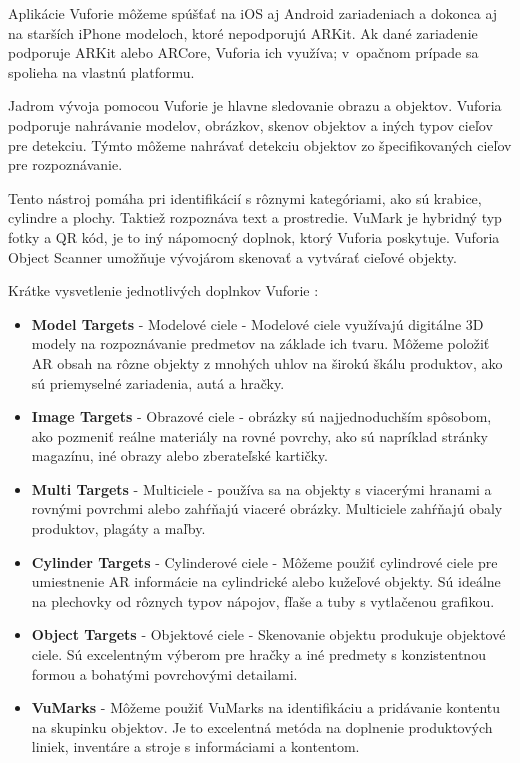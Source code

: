 Aplikácie Vuforie môžeme spúšťať na iOS aj Android zariadeniach a dokonca aj na starších iPhone modeloch, ktoré nepodporujú ARKit. Ak dané zariadenie podporuje ARKit alebo ARCore, Vuforia ich využíva; v~opačnom prípade sa spolieha na vlastnú platformu.

Jadrom vývoja pomocou Vuforie je hlavne sledovanie obrazu a objektov. Vuforia podporuje nahrávanie modelov, obrázkov, skenov objektov a iných typov cieľov pre detekciu. Týmto môžeme nahrávať detekciu objektov zo špecifikovaných cieľov pre rozpoznávanie.

Tento nástroj pomáha pri identifikácií s rôznymi kategóriami, ako sú krabice, cylindre a plochy. Taktiež rozpoznáva text a prostredie. VuMark je hybridný typ fotky a QR kód, je to iný nápomocný doplnok, ktorý Vuforia poskytuje. Vuforia Object Scanner umožňuje vývojárom skenovať a vytvárať cieľové objekty. 

Krátke vysvetlenie jednotlivých doplnkov Vuforie \cite{anand2024vuforia}:

\begin{itemize}
    \item \textbf{Model Targets} - Modelové ciele - Modelové ciele využívajú digitálne 3D modely na rozpoznávanie predmetov na základe ich tvaru. Môžeme položiť AR obsah na rôzne objekty z mnohých uhlov na širokú škálu produktov, ako sú priemyselné zariadenia, autá a hračky. %
    
    \item \textbf{Image Targets} - Obrazové ciele - obrázky sú najjednoduchším spôsobom, ako pozmeniť reálne materiály na rovné povrchy, ako sú napríklad stránky magazínu, iné obrazy alebo zberateľské kartičky.
    
    \item \textbf{Multi Targets} - Multiciele - používa sa na objekty s viacerými hranami a rovnými povrchmi alebo zahŕňajú viaceré obrázky. Multiciele zahŕňajú obaly produktov, plagáty a maľby.
    
    \item \textbf{Cylinder Targets} - Cylinderové ciele -  Môžeme použiť cylindrové ciele pre umiestnenie AR informácie na cylindrické alebo kužeľové objekty. Sú ideálne na plechovky od rôznych typov nápojov, fľaše a tuby s vytlačenou grafikou. %
    
    \item \textbf{Object Targets} - Objektové ciele - Skenovanie objektu produkuje objektové ciele. Sú excelentným výberom pre hračky a iné predmety s konzistentnou formou a bohatými povrchovými detailami. 
    
    \item \textbf{VuMarks} - Môžeme použiť VuMarks na identifikáciu a pridávanie kontentu na skupinku objektov. Je to excelentná metóda na doplnenie produktových liniek, inventáre a stroje s informáciami a kontentom. 
\end{itemize}

